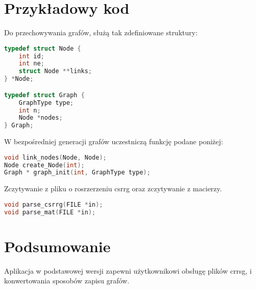 \documentclass[a4paper,12pt]{article}
\begin{document}
\section{Przykładowy kod}
Do przechowywania grafów, służą tak zdefiniowane struktury:
\begin{lstlisting}[language=C, caption=struktura grafu]
typedef struct Node {
    int id;
    int ne;
    struct Node **links;
} *Node;

typedef struct Graph {
    GraphType type;
    int n;  
    Node *nodes;
} Graph;
\end{lstlisting}
W bezpośredniej generacji grafów uczestniczą funkcję podane poniżej:
\begin{lstlisting}[language=C, caption=generacja]
void link_nodes(Node, Node);
Node create_Node(int);
Graph * graph_init(int, GraphType type);
\end{lstlisting}
Zczytywanie z pliku o rosrzerzeniu csrrg oraz zczytywanie z macierzy.
\begin{lstlisting}[language=C, caption=parsowanie i konwertowanie]
void parse_csrrg(FILE *in);
void parse_mat(FILE *in);
\end{lstlisting}

\section{Podsumowanie}
Aplikacja w podstawowej wersji zapewni użytkownikowi obsługę plików crrsg, i konwertowania sposobów zapisu grafów.
\end{document}
